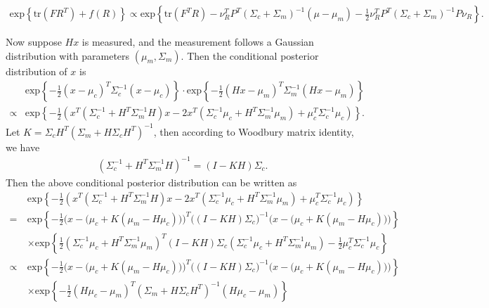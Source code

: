 \documentclass[10pt]{article}
\newcommand{\tr}[1]{\ensuremath{\mathrm{tr}\left( #1 \right)}}
\newcommand{\expb}[1]{\ensuremath{\mathrm{exp}\left\{#1\right\}}}
\begin{document}
\begin{align}
	\expb{\tr{FR^T}+f(R)} \propto \expb{\tr{F^TR} - \nu_R^TP^T(\Sigma_c+\Sigma_m)^{-1}(\mu-\mu_m) - \frac{1}{2}\nu_R^TP^T(\Sigma_c+\Sigma_m)^{-1}P\nu_R}.
\end{align}

Now suppose $Hx$ is measured, and the measurement follows a Gaussian distribution with parameters $(\mu_m,\Sigma_m)$.
Then the conditional posterior distribution of $x$ is
\begin{align}
	&\expb{-\frac{1}{2}(x-\mu_c)^T\Sigma_c^{-1}(x-\mu_c)} \cdot \expb{-\frac{1}{2}(Hx-\mu_m)^T\Sigma_m^{-1}(Hx-\mu_m)} \nonumber \\
	\propto &\expb{-\frac{1}{2}\left( x^T(\Sigma_c^{-1}+H^T\Sigma_m^{-1}H)x - 2x^T(\Sigma_c^{-1}\mu_c + H^T\Sigma_m^{-1}\mu_m) + \mu_c^T\Sigma_c^{-1}\mu_c \right)}.
\end{align}
Let $K = \Sigma_c H^T(\Sigma_m+H\Sigma_c H^T)^{-1}$, then according to Woodbury matrix identity, we have
\begin{align}
	(\Sigma_c^{-1}+H^T\Sigma_m^{-1}H)^{-1} = (I-KH)\Sigma_c.
\end{align}
Then the above conditional posterior distribution can be written as
\begin{align}
	&\expb{-\frac{1}{2}\left( x^T(\Sigma_c^{-1}+H^T\Sigma_m^{-1}H)x - 2x^T(\Sigma_c^{-1}\mu_c + H^T\Sigma_m^{-1}\mu_m) + \mu_c^T\Sigma_c^{-1}\mu_c \right)} \nonumber \\
	= &\expb{-\frac{1}{2}\Big( x-\big(\mu_c+K(\mu_m-H\mu_c)\big) \Big)^T \big((I-KH)\Sigma_c\big)^{-1} \Big( x-\big(\mu_c+K(\mu_m-H\mu_c)\big) \Big)} \nonumber \\
	\quad &\times \expb{\frac{1}{2}\left(\Sigma_c^{-1}\mu_c+H^T\Sigma_m^{-1}\mu_m\right)^T (I-KH)\Sigma_c \left(\Sigma_c^{-1}\mu_c+H^T\Sigma_m^{-1}\mu_m\right) - \frac{1}{2}\mu_c^T\Sigma_c^{-1}\mu_c} \nonumber \\
	\propto &\expb{-\frac{1}{2}\Big( x-\big(\mu_c+K(\mu_m-H\mu_c)\big) \Big)^T \big((I-KH)\Sigma_c\big)^{-1} \Big( x-\big(\mu_c+K(\mu_m-H\mu_c)\big) \Big)} \nonumber \\
	\quad &\times \expb{-\frac{1}{2}(H\mu_c-\mu_m)^T (\Sigma_m+H\Sigma_cH^T)^{-1} (H\mu_c-\mu_m)}
\end{align}
\end{document}
